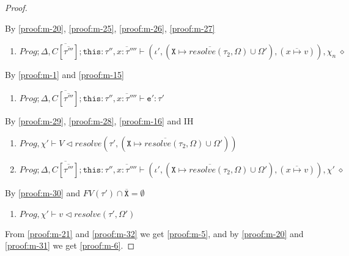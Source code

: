 \begin{proof}
\begin{enumerate}[label=\arabic*), resume]
\end{enumerate}
By \ref{proof:m-20}, \ref{proof:m-25}, \ref{proof:m-26}, \ref{proof:m-27}
\begin{enumerate}[label=\arabic*), resume]
    \item \label{proof:m-28} $Prog; \Delta, \overline{C[\overline{\tau'''}]}; \texttt{this}:\tau'', \overline{x : \tau''''} \vdash (\iota', (\overline{\texttt{X} \mapsto resolve(\tau_2, \Omega)} \cup \Omega'), (\overline{x \mapsto v})), \chi_n \; \diamond$ 
\end{enumerate}
By \ref{proof:m-1} and \ref{proof:m-15}
\begin{enumerate}[label=\arabic*), resume]
    \item \label{proof:m-29} $Prog; \Delta, \overline{C[\overline{\tau'''}]}; \texttt{this}:\tau'', \overline{x : \tau''''} \vdash \texttt{e}' : \tau' $
\end{enumerate}
By \ref{proof:m-29}, \ref{proof:m-28}, \ref{proof:m-16} and IH
\begin{enumerate}[label=\arabic*), resume]
    \item \label{proof:m-30} $Prog, \chi' \vdash V \triangleleft resolve(\tau', (\overline{\texttt{X} \mapsto resolve(\tau_2, \Omega)} \cup \Omega'))$
    \item \label{proof:m-31} $Prog; \Delta, \overline{C[\overline{\tau'''}]}; \texttt{this}:\tau'', \overline{x : \tau''''} \vdash (\iota', (\overline{\texttt{X} \mapsto resolve(\tau_2, \Omega)} \cup \Omega'), (\overline{x \mapsto v})), \chi' \; \diamond$ 
\end{enumerate}
By \ref{proof:m-30} and $FV(\tau') \cap \overline{\texttt{X}} = \emptyset$
\begin{enumerate}[label=\arabic*), resume]
    \item \label{proof:m-32} $Prog, \chi' \vdash v \triangleleft resolve(\tau', \Omega')$
\end{enumerate}
From \ref{proof:m-21} and \ref{proof:m-32} we get \ref{proof:m-5}, and by \ref{proof:m-20} and \ref{proof:m-31} we get \ref{proof:m-6}.
\end{proof} 